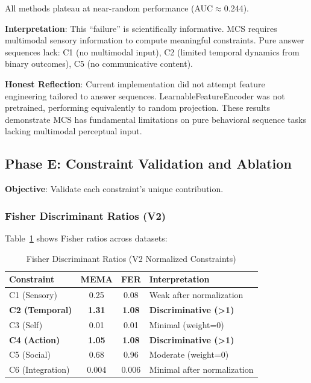 \documentclass[10pt,journal,compsoc]{IEEEtran}
\begin{document}
All methods plateau at near-random performance (AUC$\approx$0.244).

\textbf{Interpretation}: This ``failure'' is scientifically informative. MCS requires multimodal sensory information to compute meaningful constraints. Pure answer sequences lack: C1 (no multimodal input), C2 (limited temporal dynamics from binary outcomes), C5 (no communicative content).

\textbf{Honest Reflection}: Current implementation did not attempt feature engineering tailored to answer sequences. LearnableFeatureEncoder was not pretrained, performing equivalently to random projection. These results demonstrate MCS has fundamental limitations on pure behavioral sequence tasks lacking multimodal perceptual input.

\subsection{Phase E: Constraint Validation and Ablation}

\textbf{Objective}: Validate each constraint's unique contribution.

\subsubsection{Fisher Discriminant Ratios (V2)}

Table~\ref{tab:fisher} shows Fisher ratios across datasets:

\begin{table}[!t]
\renewcommand{\arraystretch}{1.3}
\caption{Fisher Discriminant Ratios (V2 Normalized Constraints)}
\label{tab:fisher}
\centering
\begin{tabular}{lccp{1.0in}}
\toprule
\textbf{Constraint} & \textbf{MEMA} & \textbf{FER} & \textbf{Interpretation} \\
\midrule
C1 (Sensory) & 0.25 & 0.08 & Weak after normalization \\
\textbf{C2 (Temporal)} & \textbf{1.31} & \textbf{1.08} & \textbf{Discriminative (>1)} \\
C3 (Self) & 0.01 & 0.01 & Minimal (weight=0) \\
\textbf{C4 (Action)} & \textbf{1.05} & \textbf{1.08} & \textbf{Discriminative (>1)} \\
C5 (Social) & 0.68 & 0.96 & Moderate (weight=0) \\
C6 (Integration) & 0.004 & 0.006 & Minimal after normalization \\
\bottomrule
\end{tabular}
\end{table}
\end{document}
